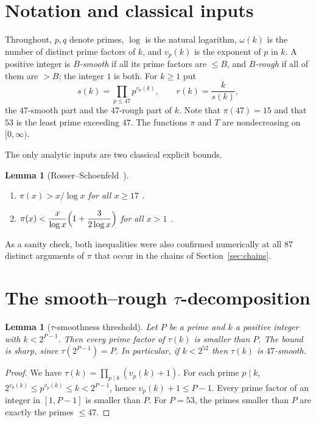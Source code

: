 \documentclass[11pt,a4paper]{article}
\newtheorem{lemma}[theorem]{Lemma}
\theoremstyle{definition}
\begin{document}
\section{Notation and classical inputs}

Throughout, $p,q$ denote primes, $\log$ is the natural logarithm, $\omega(k)$ is the number of distinct prime factors of $k$, and $v_p(k)$ is the exponent of $p$ in $k$. A positive integer is \emph{$B$-smooth} if all its prime factors are $\le B$, and \emph{$B$-rough} if all of them are $>B$; the integer $1$ is both. For $k\ge1$ put
\[
s(k)=\prod_{p\le 47}p^{v_p(k)},\qquad r(k)=\frac{k}{s(k)},
\]
the $47$-smooth part and the $47$-rough part of $k$. Note that $\pi(47)=15$ and that $53$ is the least prime exceeding $47$. The functions $\pi$ and $T$ are nondecreasing on $[0,\infty)$.

The only analytic inputs are two classical explicit bounds.

\begin{lemma}[Rosser--Schoenfeld~\cite{RS62}]\label{lem:RS}
\begin{enumerate}
\item[(a)] $\pi(x)>x/\log x$ for all $x\ge17$ \textup{\cite[Corollary~1, (3.5)]{RS62}}.
\item[(b)] $\displaystyle\pi(x)<\frac{x}{\log x}\Bigl(1+\frac{3}{2\log x}\Bigr)$ for all $x>1$ \textup{\cite[Theorem~1, (3.2)]{RS62}}.
\end{enumerate}
\end{lemma}

As a sanity check, both inequalities were also confirmed numerically at all $87$ distinct arguments of $\pi$ that occur in the chains of Section~\ref{sec:chains}.

\section{The smooth--rough \texorpdfstring{$\tau$}{tau}-decomposition}\label{sec:decomp}

\begin{lemma}[$\tau$-smoothness threshold]\label{lem:threshold}
Let $P$ be a prime and $k$ a positive integer with $k<2^{P-1}$. Then every prime factor of $\tau(k)$ is smaller than $P$. The bound is sharp, since $\tau(2^{P-1})=P$. In particular, if $k<2^{52}$ then $\tau(k)$ is $47$-smooth.
\end{lemma}

\begin{proof}
We have $\tau(k)=\prod_{p\mid k}(v_p(k)+1)$. For each prime $p\mid k$, $2^{v_p(k)}\le p^{v_p(k)}\le k<2^{P-1}$, hence $v_p(k)+1\le P-1$. Every prime factor of an integer in $[1,P-1]$ is smaller than $P$. For $P=53$, the primes smaller than $P$ are exactly the primes $\le47$.
\end{proof}
\end{document}
